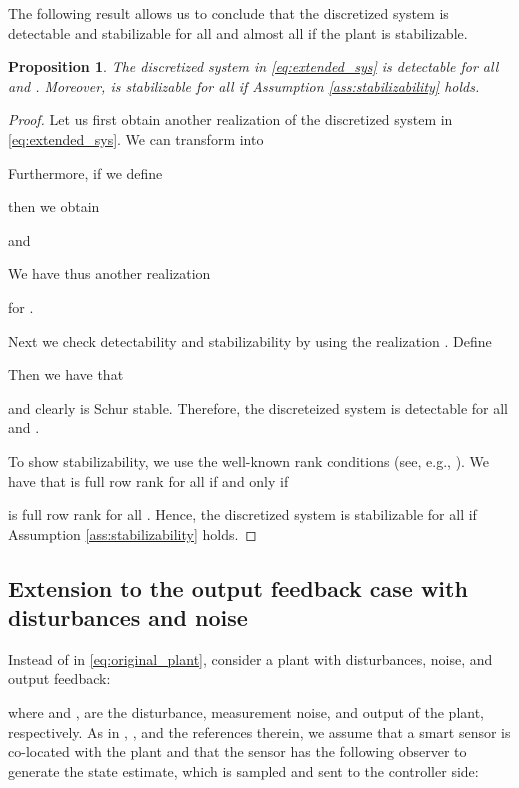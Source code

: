 \documentclass[letterpaper, 12pt, draftcls, onecolumn]{ieeeconf}
\newtheorem{proposition}[theorem]{Proposition}
\begin{document}
The following result allows us to conclude that the
discretized system 
is detectable and stabilizable for all  and almost all 
if the plant  is stabilizable.
\begin{proposition}
	\label{prop:detectability_stabilizability}
	The discretized system  in 
	\eqref{eq:extended_sys} is detectable for all  and .
	Moreover,  is stabilizable for all  if 
	Assumption \ref{ass:stabilizability} holds.
\end{proposition}
\begin{proof}
	Let us first obtain another realization 
	 of 
	the discretized system  in \eqref{eq:extended_sys}.
	We can transform  into
	
Furthermore,
	if we define
	
	then we obtain
	
	and

We have thus another realization 
	
	for .
	
	Next we check detectability and stabilizability
	by using the realization 
	. 
Define
	
	Then we have that
	
	and clearly
	 is Schur stable.
Therefore,
	the discreteized system  is detectable 
	for all  and .
	
	To show stabilizability, we use
	the well-known rank conditions (see, e.g., \cite[Sec.~3.2]{zhou1996}).
	We have that 
is full row rank for all  if and only if
	
	is full row rank for all .
	Hence, the discretized system  is stabilizable for all  if 
	Assumption \ref{ass:stabilizability} holds.
\end{proof}




\subsection{Extension to the output feedback case 
	with disturbances and noise}
Instead of  in \eqref{eq:original_plant}, consider 
a plant  with disturbances, noise, and output feedback:

where  and , 
are the disturbance, measurement noise, and output of the plant, respectively.
As in \cite[Chap.~3]{Garcia2014}, \cite{Xu2005CDC}, 
and the references therein, we assume that
a smart sensor is co-located with the
plant and that the sensor has the following observer to 
generate the state estimate, which is sampled and sent to the controller side:
\end{document}
